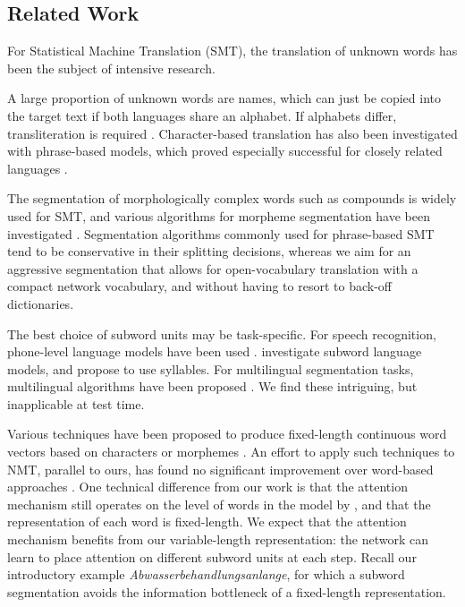 \subsection{Related Work}
\label{related-sec}

For Statistical Machine Translation (SMT), the translation of unknown words has been the subject of intensive research.

A large proportion of unknown words are names, which can just be copied into the target text if both languages share an alphabet. If alphabets differ, transliteration is required \cite{DBLP:conf/eacl/DurraniSHK14}. Character-based translation has also been investigated with phrase-based models, which proved especially successful for closely related languages \cite{vilar-peter-ney:2007:WMT,Tiedemann474916,DBLP:conf/acl/NeubigWMK12}.

The segmentation of morphologically complex words such as compounds is widely used for SMT, and various algorithms for morpheme segmentation have been investigated \cite{Niessen00improvingsmt,koehn03b,virpioja07mtsummit,DBLP:conf/acl/StallardDKLB12}. Segmentation algorithms commonly used for phrase-based SMT tend to be conservative in their splitting decisions, whereas we aim for an aggressive segmentation that allows for open-vocabulary translation with a compact network vocabulary, and without having to resort to back-off dictionaries.

The best choice of subword units may be task-specific. For speech recognition, phone-level language models have been used \cite{DBLP:conf/interspeech/BazziG00}.
 investigate subword language models, and propose to use syllables. For multilingual segmentation tasks, multilingual algorithms have been proposed \cite{snyder-barzilay:2008:ACLMain}. We find these intriguing, but inapplicable at test time.

Various techniques have been proposed to produce fixed-length continuous word vectors based on characters or morphemes \cite{DBLP:conf/conll/LuongSM13,Botha2014,ling15,DBLP:journals/corr/KimJSR15}. An effort to apply such techniques to NMT, parallel to ours, has found no significant improvement over word-based approaches \cite{2015arXiv151104586L}. One technical difference from our work is that the attention mechanism still operates on the level of words in the model by , and that the representation of each word is fixed-length. We expect that the attention mechanism benefits from our variable-length representation: the network can learn to place attention on different subword units at each step. Recall our introductory example \emph{Abwasserbehandlungsanlange}, for which a subword segmentation avoids the information bottleneck of a fixed-length representation.


